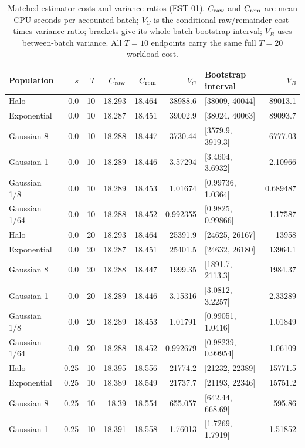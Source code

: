 \documentclass[fleqn,usenatbib]{mnras}
\begin{document}
\begin{table}
\centering
\caption{Matched estimator costs and variance ratios (EST-01). $C_{\rm raw}$ and $C_{\rm rem}$ are mean CPU seconds per accounted batch; $V_C$ is the conditional raw/remainder cost-times-variance ratio; brackets give its whole-batch bootstrap interval; $V_B$ uses between-batch variance. All $T=10$ endpoints carry the same full $T=20$ workload cost.}\label{tab-cost}
\small
\setlength{\tabcolsep}{4pt}
\begin{tabular}{lrrrrrlr}
\toprule
Population & $s$ & $T$ & $C_{\rm raw}$ & $C_{\rm rem}$ & $V_C$ & Bootstrap interval & $V_B$ \\
\midrule
Halo & 0.0 & 10 & 18.293 & 18.464 & 38988.6 & [38009, 40044] & 89013.1 \\
Exponential & 0.0 & 10 & 18.287 & 18.451 & 39002.9 & [38024, 40063] & 89093.7 \\
Gaussian 8 & 0.0 & 10 & 18.288 & 18.447 & 3730.44 & [3579.9, 3919.3] & 6777.03 \\
Gaussian 1 & 0.0 & 10 & 18.289 & 18.446 & 3.57294 & [3.4604, 3.6932] & 2.10966 \\
Gaussian 1/8 & 0.0 & 10 & 18.289 & 18.453 & 1.01674 & [0.99736, 1.0364] & 0.689487 \\
Gaussian 1/64 & 0.0 & 10 & 18.288 & 18.452 & 0.992355 & [0.9825, 0.99866] & 1.17587 \\
Halo & 0.0 & 20 & 18.293 & 18.464 & 25391.9 & [24625, 26167] & 13958 \\
Exponential & 0.0 & 20 & 18.287 & 18.451 & 25401.5 & [24632, 26180] & 13964.1 \\
Gaussian 8 & 0.0 & 20 & 18.288 & 18.447 & 1999.35 & [1891.7, 2113.3] & 1984.37 \\
Gaussian 1 & 0.0 & 20 & 18.289 & 18.446 & 3.15316 & [3.0812, 3.2257] & 2.33289 \\
Gaussian 1/8 & 0.0 & 20 & 18.289 & 18.453 & 1.01791 & [0.99051, 1.0416] & 1.01849 \\
Gaussian 1/64 & 0.0 & 20 & 18.288 & 18.452 & 0.992679 & [0.98239, 0.99954] & 1.06109 \\
Halo & 0.25 & 10 & 18.395 & 18.556 & 21774.2 & [21232, 22389] & 15771.5 \\
Exponential & 0.25 & 10 & 18.389 & 18.549 & 21737.7 & [21193, 22346] & 15751.2 \\
Gaussian 8 & 0.25 & 10 & 18.39 & 18.554 & 655.057 & [642.44, 668.69] & 595.86 \\
Gaussian 1 & 0.25 & 10 & 18.391 & 18.558 & 1.76013 & [1.7269, 1.7919] & 1.51852 \\

\end{tabular}
\end{table}
\end{document}
